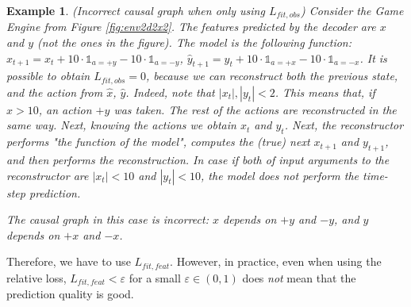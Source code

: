 \documentclass[a4paper,11pt,oneside]{report}
\newtheorem{example}{Example}[section]
\begin{document}
\begin{example}{(Incorrect causal graph when only using $L_{fit, obs}$)}
    Consider the Game Engine from Figure \ref{fig:env2d2x2}. The features predicted by the decoder are $x$ and $y$ (not the ones in the figure).
    The model is the following function: $\hat{x}_{t+1}=x_t+10\cdot\mathds 1_{a=+y}-10\cdot\mathds 1_{a=-y}$, $\hat{y}_{t+1}=y_t+10\cdot\mathds 1_{a=+x}-10\cdot\mathds 1_{a=-x}$.
    It is possible to obtain $L_{fit, obs}=0$, because we can reconstruct both the previous state, and the action from $\hat{x}$, $\hat{y}$. Indeed, note that $|x_t|,|y_t|<2$. This means that, if $\hat{x}>10$, an action $+y$ was taken. The rest of the actions are reconstructed in the same way.
    Next, knowing the actions we obtain $x_t$ and $y_t$. Next, the reconstructor performs "the function of the model", computes the (true) next $x_{t+1}$ and $y_{t+1}$, and then performs the reconstruction.
    In case if both of input arguments to the reconstructor are $|x_t|<10$ and $|y_t|<10$, the model does not perform the time-step prediction.

    The causal graph in this case is incorrect: $x$ depends on $+y$ and $-y$, and $y$ depends on $+x$ and $-x$.
\end{example}

Therefore, we have to use $L_{fit,feat}$. However, in practice, even when using the relative loss, $L_{fit, feat}<\varepsilon$ for a small $\varepsilon\in(0,1)$ does {\em not} mean that the prediction quality is good.
\end{document}

